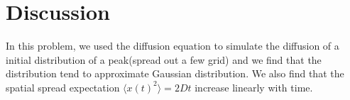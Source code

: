 \documentclass{article}
\begin{document}
\section{Discussion}
\quad In this problem, we used the diffusion equation to simulate the diffusion of a initial distribution of a peak(spread out a few grid) and we find that the distribution tend to approximate Gaussian distribution. We also find that the spatial spread expectation $\langle x(t)^2\rangle=2Dt$ increase linearly with time.
\end{document}
